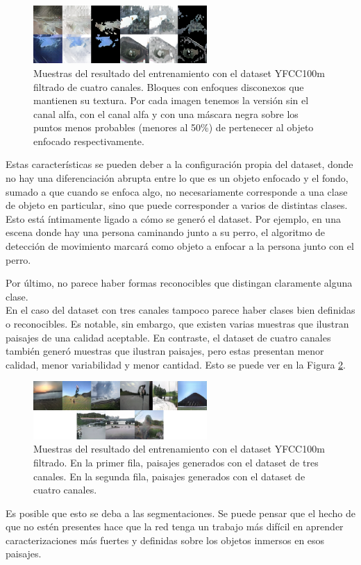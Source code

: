 \documentclass[spanish]{report}
\begin{document}
\begin{figure}[h]
\centering
 \includegraphics[width=250px]{enfoques_inconexos.png}
   \caption{Muestras del resultado del entrenamiento con el dataset YFCC100m filtrado de cuatro canales. Bloques con enfoques disconexos que mantienen su textura. Por cada imagen tenemos la versión sin el canal alfa, con el canal alfa y con una máscara negra sobre los puntos menos probables (menores al 50\%) de pertenecer al objeto enfocado respectivamente.}
  \label{fig:enfoques_inconexos}
\end{figure}

Estas características se pueden deber a la configuración propia del dataset, donde no hay una diferenciación abrupta entre lo que es un objeto enfocado y el fondo, sumado a que cuando se enfoca algo, no necesariamente corresponde a una clase de objeto en particular, sino que puede corresponder a varios de distintas clases. Esto está íntimamente ligado a cómo se generó el dataset. Por ejemplo, en una escena donde hay una persona caminando junto a su perro, el algoritmo de detección de movimiento marcará como objeto a enfocar a la persona junto con el perro.

Por último, no parece haber formas reconocibles que distingan claramente alguna clase.\\

En el caso del dataset con tres canales tampoco parece haber clases bien definidas o reconocibles. Es notable, sin embargo, que existen varias muestras que ilustran paisajes de una calidad aceptable. En contraste, el dataset de cuatro canales también generó muestras que ilustran paisajes, pero estas presentan menor calidad, menor variabilidad y menor cantidad. Esto se puede ver en la Figura \ref{fig:paisajes_filtered}.

\begin{figure}[h]
\centering
 \includegraphics[width=250px]{paisajes_filtered.png}
   \caption{Muestras del resultado del entrenamiento con el dataset YFCC100m filtrado. En la primer fila, paisajes generados con el dataset de tres canales. En la segunda fila, paisajes generados con el dataset de cuatro canales.}
  \label{fig:paisajes_filtered}
\end{figure}
\noindent Es posible que esto se deba a las segmentaciones. Se puede pensar que el hecho de que no estén presentes hace que la red tenga un trabajo más difícil en aprender caracterizaciones más fuertes y definidas sobre los objetos inmersos en esos paisajes.
\end{document}
